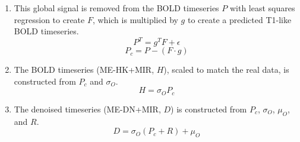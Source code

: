 \documentclass[10pt]{article}
\begin{document}
\begin{enumerate}
  \item
  This global signal is removed from the BOLD timeseries $P$ with least squares
  regression to create $F$, which is multiplied by $g$ to create a predicted
  T1-like BOLD timeseries.
    \begin{equation}
      P^T = g^{T}F + \epsilon
    \end{equation}
    \begin{equation}
      P_{c} = P - (F \cdot g)
    \end{equation}

  \item
  The BOLD timeseries (ME-HK+MIR, $H$), scaled to match the real data, is
  constructed from $P_{c}$ and $\sigma_{O}$.
    \begin{equation}
      {H} = \sigma_{O}P_{c}
    \end{equation}

  \item
  The denoised timeseries (ME-DN+MIR, $D$) is constructed from $P_{c}$, $\sigma_{O}$,
  $\mu_{O}$, and $R$.
    \begin{equation}
      {D} = \sigma_{O}(P_{c} + R) + \mu_{O}
    \end{equation}

\end{enumerate}
\end{document}
